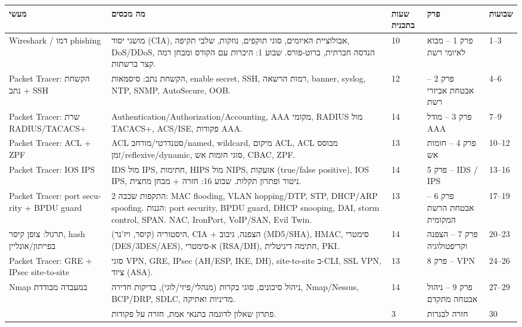 \documentclass[11pt]{article}
\newcommand{\enLR}[1]{\textenglish{#1}}
\begin{document}
\begin{xltabular}{\linewidth}{|>{\setRTL\raggedleft\arraybackslash}X|>{\setRTL\raggedleft\arraybackslash}X|>{\setRTL\raggedleft\arraybackslash}X|>{\setRTL\raggedleft\arraybackslash}X|>{\setRTL\raggedleft\arraybackslash}X|}
\hline
{}\textbf{מעשי} & \textbf{מה מכסים} & \textbf{שעות בתכנית} & \textbf{פרק} & \textbf{שבועות} \\
\hline
\endhead
\enLR{Wireshark} / דמו \enLR{phishing} & מושגי יסוד \enLR{(CIA)}, אבולוציית האיומים, סוגי תוקפים, נוזקות, שלבי תקיפה, \enLR{DoS/DDoS}, הנדסה חברתית, ברוט-פורס. שבוע \enLR{1}: היכרות עם הקורס ומבחן רמה קצר ברשתות. & \enLR{10} & פרק \enLR{1} – מבוא לאיומי רשת & \enLR{1}–\enLR{3} \\
\hline
\enLR{Packet Tracer}: הקשחת נתב + \enLR{SSH} & הקשחת נתב: סיסמאות, \enLR{enable secret, SSH}, רמות הרשאה, \enLR{banner, syslog, NTP, SNMP, AutoSecure, OOB.} & \enLR{12} & פרק \enLR{2} – אבטחת אביזרי רשת & \enLR{4}–\enLR{6} \\
\hline
\enLR{Packet Tracer}: שרת \enLR{RADIUS/TACACS}+ & \enLR{Authentication/Authorization/Accounting, AAA} מקומי, \enLR{RADIUS} מול \enLR{TACACS+, ACS/ISE}, פקודות \enLR{AAA.} & \enLR{14} & פרק \enLR{3} – מודל \enLR{AAA} & \enLR{7}–\enLR{9} \\
\hline
\enLR{Packet Tracer: ACL + ZPF} & \enLR{ACL} סטנדרטי/מורחב/\enLR{named, wildcard}, מיקום \enLR{ACL, ACL} מבוסס זמן/\enLR{reflexive/dynamic}, סוגי חומות אש, \enLR{CBAC, ZPF.} & \enLR{13} & פרק \enLR{4} – חומות אש & \enLR{10}–\enLR{12} \\
\hline
\enLR{Packet Tracer: IOS IPS} & \enLR{IDS} מול \enLR{IPS}, חתימות, \enLR{HIPS} מול \enLR{NIPS}, אזעקות \enLR{(true/false positive), IOS IPS}, ניטור ופתרון תקלות. שבוע \enLR{16}: חזרה + מבחן מחצית. & \enLR{14} & פרק \enLR{5} – \enLR{IDS / IPS} & \enLR{13}–\enLR{16} \\
\hline
\enLR{Packet Tracer: port security + BPDU guard} & התקפות שכבה \enLR{2: MAC flooding, VLAN hopping/DTP, STP, DHCP/ARP spoofing.} הגנות: \enLR{port security, BPDU guard, DHCP snooping, DAI, storm control, SPAN. NAC, IronPort, VoIP/SAN, Evil Twin.} & \enLR{13} & פרק \enLR{6} – אבטחת הרשת המקומית & \enLR{17}–\enLR{19} \\
\hline
תרגול: צופן קיסר, \enLR{hash} בפייתון/אונליין & היסטוריה (קיסר, ויז'נר), \enLR{CIA} + הצפנה, גיבוב \enLR{(MD5/SHA), HMAC}, סימטרי \enLR{(DES/3DES/AES)}, א-סימטרי \enLR{(RSA/DH)}, חתימה דיגיטלית, \enLR{PKI.} & \enLR{14} & פרק \enLR{7} – הצפנה וקריפטולוגיה & \enLR{20}–\enLR{23} \\
\hline
\enLR{Packet Tracer: GRE + IPsec site-to-site} & סוגי \enLR{VPN, GRE, IPsec (AH/ESP, IKE, DH), site-to-site} ב-\enLR{CLI, SSL VPN}, ציוד \enLR{(ASA).} & \enLR{13} & פרק \enLR{8} – \enLR{VPN} & \enLR{24}–\enLR{26} \\
\hline
\enLR{Nmap} במעבדה מבודדת & ניהול סיכונים, סוגי בקרות (מנהלי/פיזי/לוגי), בדיקות חדירה, \enLR{Nmap/Nessus, BCP/DRP, SDLC}, מדיניות ואתיקה. & \enLR{14} & פרק \enLR{9} – ניהול אבטחה מתקדם & \enLR{27}–\enLR{29} \\
\hline
 & פתרון שאלון לדוגמה בתנאי אמת, חזרה על פקודות. & \enLR{3} & חזרה לבגרות & \enLR{30} \\
\hline
\end{xltabular}
\end{document}
